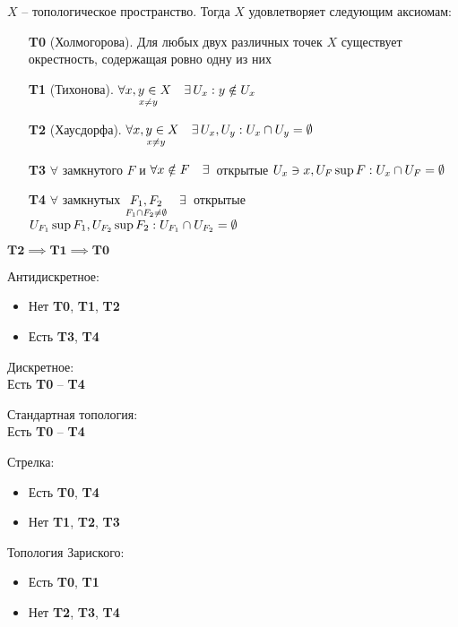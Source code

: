 \begin{definition}
	$ X $ -- топологическое пространство. Тогда $ X $ удовлетворяет следующим аксиомам:
	\begin{enumerate}
		\item[\textbf{T0}](Холмогорова). Для любых двух различных точек $ X $ существует окрестность, содержащая ровно одну из них
		\item[\textbf{T1}](Тихонова). $ \forall \underset{x \ne y}{x, y \in X} \quad \exists\, U_x : y \notin U_x $
		\item[\textbf{T2}](Хаусдорфа). $ \forall \underset{x \ne y}{x, y \in X} \quad \exists\, U_x, U_y : U_x \cap U_y = \emptyset $
		\item[\textbf{T3}] $ \forall $ замкнутого $ F $ и $ \forall x \notin F \quad \exists\, $ открытые $ U_x \ni x, U_F \sup F : U_x \cap U_F = \emptyset $
		\item[\textbf{T4}] $ \forall $ замкнутых $ \underset{F_1 \cap F_2 \ne \emptyset}{F_1, F_2} \quad \exists\, $ открытые $ U_{F_1} \sup F_1, U_{F_2} \sup F_2 : U_{F_1} \cap U_{F_2} = \emptyset $
	\end{enumerate}
\end{definition}

\begin{remark}
	$ \textbf{T2} \implies \textbf{T1} \implies \textbf{T0} $
\end{remark}

\begin{exmpls}
	\item Антидискретное:
	\begin{itemize}
		\item Нет \textbf{T0}, \textbf{T1}, \textbf{T2}
		\item Есть \textbf{T3}, \textbf{T4}
	\end{itemize}
	\item Дискретное: \\
	Есть \textbf{T0} -- \textbf{T4}
	\item Стандартная топология: \\
	Есть \textbf{T0} -- \textbf{T4}
	\item Стрелка:
	\begin{itemize}
		\item Есть \textbf{T0}, \textbf{T4}
		\item Нет \textbf{T1}, \textbf{T2}, \textbf{T3}
	\end{itemize}
	\item Топология Зариского:
	\begin{itemize}
		\item Есть \textbf{T0}, \textbf{T1}
		\item Нет \textbf{T2}, \textbf{T3}, \textbf{T4}
	\end{itemize}
\end{exmpls}

